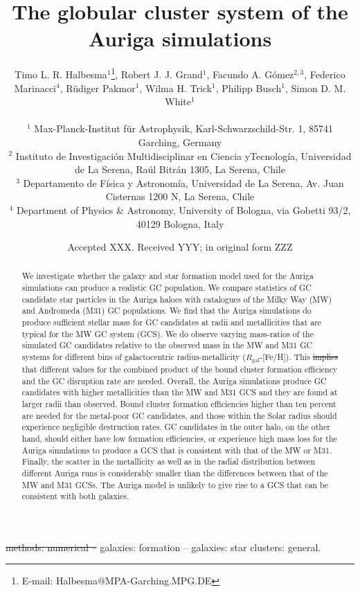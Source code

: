 \documentclass[a4paper,fleqn,usenatbib]{mnras}
\title[Auriga GCS]{The globular cluster system of the Auriga simulations}
\author[T. L. R. Halbesma et al.]{\parbox[t]{\textwidth}{
    Timo L. R. Halbesma$^{1}$\thanks{E-mail: Halbesma@MPA-Garching.MPG.DE},
    Robert J. J. Grand$^{1}$,
    Facundo A. G\'{o}mez$^{2,3}$,
    Federico Marinacci$^{4}$,
    R\"{u}diger Pakmor$^{1}$,
    Wilma H. Trick$^{1}$,
    Philipp Busch$^{1}$,
    Simon D. M. White$^{1}$
} \vspace{10pt} \\
$^{1}$ Max-Planck-Institut f\"ur Astrophysik, Karl-Schwarzschild-Str. 1,
    85741 Garching, Germany \\
$^{2}$ Instituto de Investigaci\'{o}n Multidisciplinar en Ciencia yTecnolog\'{i}a,
    Universidad de La Serena, Ra\'{u}l Bitr\'{a}n 1305, La Serena, Chile \\
$^{3}$ Departamento de F\'{i}sica y Astronom\'{i}a, Universidad de La Serena, Av.
    Juan Cisternas 1200 N, La Serena, Chile \\
$^{4}$ Department of Physics \& Astronomy, University of Bologna, via Gobetti 93/2, 40129 Bologna, Italy \\
}
\date{Accepted XXX. Received YYY; in original form ZZZ}
\providecommand{\DIFadd}[1]{{\protect\color{blue}\uwave{#1}}} %
\providecommand{\DIFdel}[1]{{\protect\color{red}\sout{#1}}}                      %
\providecommand{\DIFaddbegin}{} %
\providecommand{\DIFaddend}{} %
\providecommand{\DIFdelbegin}{} %
\providecommand{\DIFdelend}{} %
\newcommand{\DIFscaledelfig}{0.5}
\newlength{\DIFdelgraphicswidth} %
\newlength{\DIFdelgraphicsheight} %
\newcommand{\DIFaddincludegraphics}[2][]{{\color{blue}\fbox{\DIFOincludegraphics[#1]{#2}}}} %
\newcommand{\DIFdelincludegraphics}[2][]{%
\sbox{\DIFdelgraphicsbox}{\DIFOincludegraphics[#1]{#2}}%
\settoboxwidth{\DIFdelgraphicswidth}{\DIFdelgraphicsbox} %
\settoboxtotalheight{\DIFdelgraphicsheight}{\DIFdelgraphicsbox} %
\scalebox{\DIFscaledelfig}{%
\parbox[b]{\DIFdelgraphicswidth}{\usebox{\DIFdelgraphicsbox}\\[-\baselineskip] \rule{\DIFdelgraphicswidth}{0em}}\llap{\resizebox{\DIFdelgraphicswidth}{\DIFdelgraphicsheight}{%
\setlength{\unitlength}{\DIFdelgraphicswidth}%
\begin{picture}(1,1)%
\thicklines\linethickness{2pt} %
{\color[rgb]{1,0,0}\put(0,0){\framebox(1,1){}}}%
{\color[rgb]{1,0,0}\put(0,0){\line( 1,1){1}}}%
{\color[rgb]{1,0,0}\put(0,1){\line(1,-1){1}}}%
\end{picture}%
}\hspace*{3pt}}} %
} %
\DeclareRobustCommand{\DIFaddbegin}{\DIFOaddbegin \let\includegraphics\DIFaddincludegraphics} %
\DeclareRobustCommand{\DIFaddend}{\DIFOaddend \let\includegraphics\DIFOincludegraphics} %
\DeclareRobustCommand{\DIFdelbegin}{\DIFOdelbegin \let\includegraphics\DIFdelincludegraphics} %
\DeclareRobustCommand{\DIFdelend}{\DIFOaddend \let\includegraphics\DIFOincludegraphics} %
\begin{document}
\label{firstpage}
\pagerange{\pageref{firstpage}--\pageref{lastpage}}
\maketitle

\begin{abstract}
We investigate whether the galaxy and star formation model used for the Auriga
simulations can produce a realistic GC population. We compare statistics of GC 
candidate star particles in the Auriga haloes with catalogues of the Milky Way 
(MW) and Andromeda (M31) GC populations. We find that the Auriga simulations do 
produce sufficient stellar mass for GC candidates at radii and metallicities that 
are typical for the MW GC system (GCS). We do observe varying mass-ratios of the
simulated GC candidates relative to the observed mass in the MW and M31 GC systems
for different bins of galactocentric radius-metallicity (\DIFdelbegin \DIFdel{$R_{\text{gal}}$}\DIFdelend \DIFaddbegin \DIFadd{$r_{\text{gal}}$}\DIFaddend -[Fe/H]).
This \DIFdelbegin \DIFdel{implies }\DIFdelend \DIFaddbegin \DIFadd{may imply }\DIFaddend that different values for the combined product of the bound cluster 
formation efficiency and the GC disruption rate are needed. Overall, the Auriga 
simulations produce GC candidates with higher metallicities than the MW and M31 
GCS and they are found at larger radii than observed. Bound cluster formation
efficiencies higher than ten percent are needed for the metal-poor GC candidates,
and those within the Solar radius should experience negligible destruction rates.
GC candidates in the outer halo, on the other hand, should either have low formation
efficiencies, or experience high mass loss for the Auriga simulations to produce a
GCS that is consistent with that of the MW or M31. Finally, the scatter in the 
metallicity as well as in the radial distribution between different Auriga runs 
is considerably smaller than the differences between that of the MW and M31 GCSs. 
The Auriga model is unlikely to give rise to a GCS that can be consistent with
both galaxies.
\end{abstract}

\begin{keywords}
\DIFdelbegin \DIFdel{methods: numerical -- }\DIFdelend galaxies: formation -- galaxies: star clusters: general.
\end{keywords}
\end{document}
